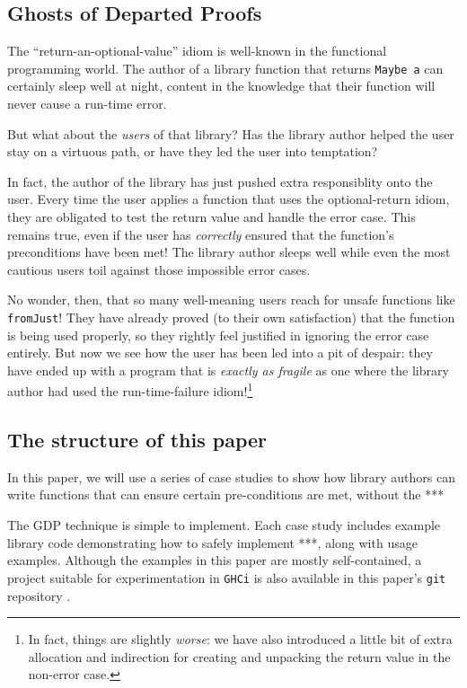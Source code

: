 \documentclass[format=sigplan, review=false, screen=true]{acmart}
\begin{document}
\subsection{Ghosts of Departed Proofs}
The ``return-an-optional-value'' idiom is well-known in the functional programming world.
The author of a library function that returns \texttt{Maybe a} can certainly sleep well
at night, content in the knowledge that their function will never cause a run-time error.

But what about the \emph{users} of that library? Has the library author helped the user stay
on a virtuous path, or have they led the user into temptation?

In fact, the author of the library has just pushed extra responsiblity onto the user.
Every time the user applies a function that uses the optional-return idiom, they are obligated
to test the return value and handle the error case. This remains true, even if the user
has \emph{correctly} ensured that the function's preconditions have been met! The library
author sleeps well while even the most cautious users toil against those impossible error cases.

No wonder, then, that so many well-meaning users reach for unsafe functions like \texttt{fromJust}!
They have already proved (to their own satisfaction) that the function is being used properly, so they rightly
feel justified in ignoring the error case entirely. But now we see how the user has been led into
a pit of despair: they have ended up with a program that is \emph{exactly as fragile} as one where the library
author had used the run-time-failure idiom!\footnote{In fact, things are slightly \emph{worse}: we have also introduced a little
bit of extra allocation and indirection for creating and unpacking the return value in the non-error case.}

\subsection{The structure of this paper}
In this paper, we will use a series of case studies to show how library authors can write
functions that can ensure certain pre-conditions are met, without the  ***

The GDP technique is simple to implement. Each case study includes example library code
demonstrating how to safely implement ***, along with usage examples. Although the
examples in this paper are mostly self-contained, a project suitable for experimentation in
\texttt{GHCi} is also available in this paper's \texttt{git} repository \cite{this}.
\end{document}
